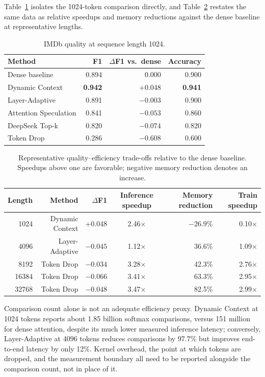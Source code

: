 \documentclass[11pt]{article}
\begin{document}
Table~\ref{tab:quality-1024} isolates the 1024-token comparison directly, and
Table~\ref{tab:tradeoffs} restates the same data as relative speedups and
memory reductions against the dense baseline at representative lengths.

\begin{table}[H]
  \centering
  \small
  \caption{IMDb quality at sequence length 1024.}
  \label{tab:quality-1024}
  \begin{tabular}{@{}lrrr@{}}
    \toprule
    Method & F1 & $\Delta$F1 vs.\ dense & Accuracy \\
    \midrule
    Dense baseline & 0.894 & 0.000 & 0.900 \\
    Dynamic Context & \textbf{0.942} & +0.048 & \textbf{0.941} \\
    Layer-Adaptive & 0.891 & $-0.003$ & 0.900 \\
    Attention Speculation & 0.841 & $-0.053$ & 0.860 \\
    DeepSeek Top-k & 0.820 & $-0.074$ & 0.820 \\
    Token Drop & 0.286 & $-0.608$ & 0.600 \\
    \bottomrule
  \end{tabular}
\end{table}

\begin{table}[H]
  \centering
  \small
  \caption{Representative quality--efficiency trade-offs relative to the dense
  baseline. Speedups above one are favorable; negative memory reduction denotes
  an increase.}
  \label{tab:tradeoffs}
  \begin{tabular}{@{}rrrcrr@{}}
    \toprule
    Length & Method & $\Delta$F1 & Inference speedup & Memory reduction & Train speedup \\
    \midrule
    1024  & Dynamic Context & +0.048 & 2.46$\times$ & $-26.9$\% & 0.10$\times$ \\
    4096  & Layer-Adaptive & $-0.045$ & 1.12$\times$ & 36.6\% & 1.09$\times$ \\
    8192  & Token Drop & $-0.034$ & 3.28$\times$ & 42.3\% & 2.76$\times$ \\
    16384 & Token Drop & $-0.066$ & 3.41$\times$ & 63.3\% & 2.95$\times$ \\
    32768 & Token Drop & $-0.048$ & 3.47$\times$ & 82.5\% & 2.99$\times$ \\
    \bottomrule
  \end{tabular}
\end{table}

Comparison count alone is not an adequate efficiency proxy. Dynamic Context at
1024 tokens reports about 1.85 billion softmax comparisons, versus 151 million
for dense attention, despite its much lower measured inference latency;
conversely, Layer-Adaptive at 4096 tokens reduces comparisons by 97.7\% but
improves end-to-end latency by only 12\%. Kernel overhead, the point at which
tokens are dropped, and the measurement boundary all need to be reported
alongside the comparison count, not in place of it.
\end{document}
